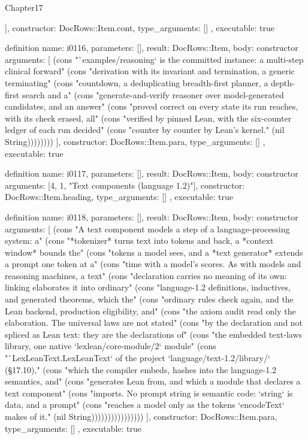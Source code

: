 \begin{lexlean}{Chapter17}
\begin{semanticmodule}
{{    ],
    constructor: DocRows::Item.cont,
    type_arguments: []
  },
  executable: true
}

definition{
  name: i0116,
  parameters: [],
  result: DocRows::Item,
  body: constructor{
    arguments: [
      (cons "`examples/reasoning` is the committed instance: a multi-step clinical forward" (cons "derivation with its invariant and termination, a generic terminating" (cons "countdown, a deduplicating breadth-first planner, a depth-first search and a" (cons "generate-and-verify reasoner over model-generated candidates, and an answer" (cons "proved correct on every state its run reaches, with its check erased, all" (cons "verified by pinned Lean, with the six-counter ledger of each run decided" (cons "counter by counter by Lean's kernel." (nil String))))))))
    ],
    constructor: DocRows::Item.para,
    type_arguments: []
  },
  executable: true
}

definition{
  name: i0117,
  parameters: [],
  result: DocRows::Item,
  body: constructor{
    arguments: [4, 1, "Text components (language 1.2)"],
    constructor: DocRows::Item.heading,
    type_arguments: []
  },
  executable: true
}

definition{
  name: i0118,
  parameters: [],
  result: DocRows::Item,
  body: constructor{
    arguments: [
      (cons "A text component models a step of a language-processing system: a" (cons "*tokenizer* turns text into tokens and back, a *context window* bounds the" (cons "tokens a model sees, and a *text generator* extends a prompt one token at a" (cons "time with a model's scores. As with models and reasoning machines, a text" (cons "declaration carries no meaning of its own: linking elaborates it into ordinary" (cons "language-1.2 definitions, inductives, and generated theorems, which the" (cons "ordinary rules check again, and the Lean backend, production eligibility, and" (cons "the axiom audit read only the elaboration. The universal laws are not stated" (cons "by the declaration and not spliced as Lean text: they are the declarations of" (cons "the embedded text-laws library, one native `lexlean/core-module/2` module" (cons "`LexLeanText.LexLeanText` of the project `language/text-1.2/library/` (§17.10)," (cons "which the compiler embeds, hashes into the language-1.2 semantics, and" (cons "generates Lean from, and which a module that declares a text component" (cons "imports. No prompt string is semantic code: `string` is data, and a prompt" (cons "reaches a model only as the tokens `encodeText` makes of it." (nil String))))))))))))))))
    ],
    constructor: DocRows::Item.para,
    type_arguments: []
  },
  executable: true
}


\end{semanticmodule}
\end{lexlean}
